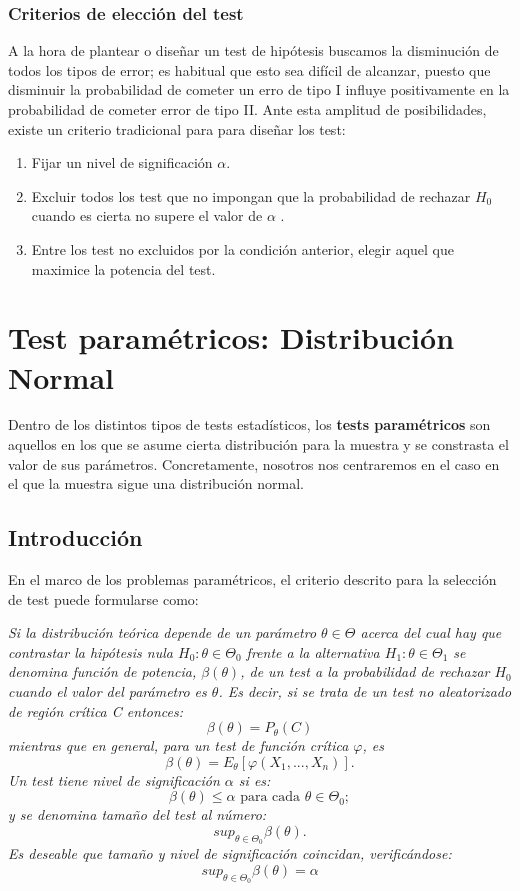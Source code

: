 \documentclass[a4paper,12pt]{article}
\begin{document}
\subsubsection{Criterios de elección del test}
    A la hora de plantear o diseñar un test de hipótesis buscamos la disminución de todos los tipos de error; es habitual que esto sea difícil de alcanzar, puesto que disminuir la probabilidad de cometer un erro de tipo I influye positivamente en la probabilidad de cometer error de tipo II. Ante esta amplitud de posibilidades, existe un criterio tradicional para para diseñar los test:
\begin{enumerate}
	\item Fijar un nivel de significación $\alpha$.
	\item Excluir todos los test que no impongan que la probabilidad de rechazar $H_0$ cuando es cierta no supere el valor de $\alpha$ . 
	\item  Entre los test no excluidos por la condición anterior, elegir aquel que maximice la potencia del test.
\end{enumerate}


\section{Test paramétricos: Distribución Normal}

     Dentro de los distintos tipos de tests estadísticos, los \textbf{tests paramétricos} son aquellos en los que se asume cierta distribución para la muestra y se constrasta el valor de sus parámetros.
     Concretamente, nosotros nos centraremos en el caso en el que la muestra sigue una distribución normal.
     
\subsection{Introducción}
En el marco de los problemas paramétricos, el criterio descrito para la selección de test puede formularse como:


\textit{ Si la distribución teórica depende de un parámetro $\theta \in \Theta$ acerca del cual hay que contrastar la hipótesis nula $H_0: \theta \in \Theta_0$ frente a la alternativa $H_1: \theta \in \Theta_1$ se denomina función de potencia, $\beta(\theta)$, de un test a la probabilidad de rechazar $H_0$ cuando el valor del parámetro es $\theta$. Es decir, si se trata de un test no aleatorizado de región crítica C entonces: $$\beta(\theta)=P_\theta(C)$$
mientras que en general, para un test de función crítica $\varphi$, es $$\beta(\theta)=E_\theta[\varphi(X_1,...,X_n)].$$
Un test tiene nivel de significación $\alpha$ si es:  $$\beta(\theta)\leq\alpha \text{ para cada } \theta \in \Theta_0;$$
y se denomina tamaño del test al número: $$sup_{\theta\in\Theta_0}\beta(\theta).$$
Es deseable que tamaño y nivel de significación coincidan, verificándose: 
$$sup_{\theta\in\Theta_0}\beta(\theta)=\alpha$$ }
\end{document}
